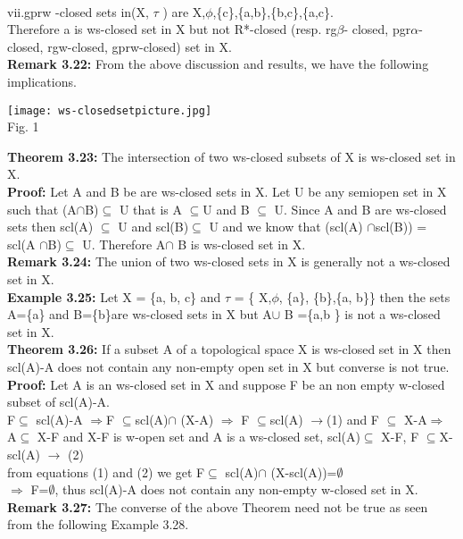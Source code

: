 {{{				\\vii.gprw -closed sets in(X, $\tau$ ) are X,$\phi$,\{c\},\{a,b\},\{b,c\},\{a,c\}.
				\\\indent Therefore {a} is ws-closed set in X but not R*-closed (resp. rg$\beta$- closed, pgr$\alpha$-closed, rgw-closed, gprw-closed) set in X.
				\\\textbf{Remark 3.22:} From the above discussion and results,  we have the following implications.	
				\begin{center}
					\texttt{[image: ws-closedsetpicture.jpg]}
					\\Fig. 1
				\end{center}
				\textbf{Theorem 3.23:} The intersection of two ws-closed subsets of X is ws-closed set in X.
				\\\textbf{Proof:} Let A and B be are ws-closed sets in X. Let U be any semiopen set in X such that (A$\cap$B)$\subseteq$ U that is A $\subseteq$U and B $\subseteq$ U. Since A and B are ws-closed sets then scl(A)  $\subseteq$ U and scl(B)$\subseteq$ U and we know that (scl(A) $\cap$scl(B)) = scl(A $\cap$B)$\subseteq$ U. Therefore A$\cap$ B is ws-closed set in X.
				\\\textbf{Remark 3.24:} The union of two ws-closed sets in X is generally not a ws-closed set in X.
				\\\textbf{Example 3.25:} Let X = \{a, b, c\} and  $\tau$ = \{ X,$\phi$, \{a\}, \{b\},\{a, b\}\} then the sets A=\{a\} and B=\{b\}are ws-closed sets in X but A$\cup$ B =\{a,b \} is not a  ws-closed set in X.
				\\\textbf{Theorem 3.26:} If a subset A of a topological space X is ws-closed set in X then scl(A)-A does not contain any non-empty open set in X but converse is not true.
				\\\textbf{Proof:} Let A is an ws-closed set in X and suppose F be an non empty w-closed subset of scl(A)-A.
				\\F$\subseteq$ scl(A)-A $\Longrightarrow$F $\subseteq$scl(A)$\cap$ (X-A) $\Longrightarrow$ F $\subseteq$scl(A) $\longrightarrow$(1) and F $\subseteq$ X-A$\Longrightarrow$
				A$\subseteq$ X-F and X-F is w-open set and A is a ws-closed set, scl(A)$\subseteq$ X-F,
				F $\subseteq$X-scl(A) $\longrightarrow$ (2)
				\\ from equations (1) and (2) we get F$\subseteq$ scl(A)$\cap$ (X-scl(A))=$\emptyset$
				\\$\Longrightarrow$ F=$\emptyset$, thus scl(A)-A does not contain any non-empty w-closed set in X.
				\\\textbf{Remark 3.27:} The converse of the above Theorem need not be true as seen from the following Example 3.28.
}}}
